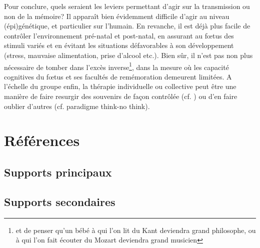 \documentclass[french]{article}
\begin{document}
			Pour conclure, quels seraient les leviers permettant d'agir sur la transmission ou non de la mémoire? Il apparaît bien évidemment difficile d'agir au niveau (épi)génétique, et particulier sur l'humain. En revanche, il est déjà plus facile de contrôler l'environnement pré-natal et post-natal, en assurant au fœtus des stimuli variés et en évitant les situations défavorables à son développement (stress, mauvaise alimentation, prise d'alcool etc.). Bien sûr, il n'est pas non plus nécessaire de tomber dans l'excès inverse\footnote{et de penser qu'un bébé à qui l'on lit du Kant deviendra grand philosophe, ou à qui l'on fait écouter du Mozart deviendra grand musicien}, dans la mesure où les capacité cognitives du fœtus et ses facultés de remémoration demeurent limitées. A l'échelle du groupe enfin, la thérapie individuelle ou collective peut être une manière de faire resurgir des souvenirs de façon contrôlée (cf. \cite{fossion2003}) ou d'en faire oublier d'autres (cf. paradigme think-no think).
			
			
			
	\newpage
	\section*{Références}
	\subsection*{Supports principaux}
	\printbibliography[heading=maingeno, keyword=main, keyword=geno]
	\printbibliography[heading=maindevelo, keyword=main, keyword=develo]
	\printbibliography[heading=mainsocio, keyword=main, keyword=socio]
	\subsection*{Supports secondaires}
	\printbibliography[heading=minorgeno, keyword=minor, keyword=geno]
	\printbibliography[heading=minordevelo, keyword=minor, keyword=develo]
	\printbibliography[heading=minorsocio, keyword=minor, keyword=socio]
	\nocite{*}
\end{document}
